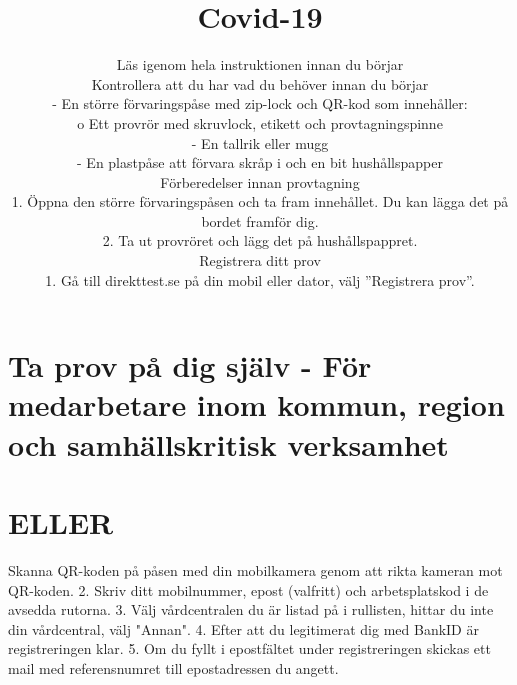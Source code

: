 \title{
Covid-19
}
\section*{Ta prov på dig själv - För medarbetare inom kommun, region och samhällskritisk verksamhet}
\author{
Läs igenom hela instruktionen innan du börjar \\ Kontrollera att du har vad du behöver innan du börjar \\ - En större förvaringspåse med zip-lock och QR-kod som innehåller: \\ o Ett provrör med skruvlock, etikett och provtagningspinne \\ - En tallrik eller mugg \\ - En plastpåse att förvara skråp i och en bit hushållspapper \\ Förberedelser innan provtagning \\ 1. Öppna den större förvaringspåsen och ta fram innehållet. Du kan lägga det på bordet framför dig. \\ 2. Ta ut provröret och lägg det på hushållspappret.
 \\ Registrera ditt prov \\ 1. Gå till direkttest.se på din mobil eller dator, välj ”Registrera prov”.
}
\section*{ELLER}
Skanna QR-koden på påsen med din mobilkamera genom att rikta kameran mot QR-koden.
2. Skriv ditt mobilnummer, epost (valfritt) och arbetsplatskod i de avsedda rutorna.
3. Välj vårdcentralen du är listad på i rullisten, hittar du inte din vårdcentral, välj "Annan".
4. Efter att du legitimerat dig med BankID är registreringen klar.
5. Om du fyllt i epostfältet under registreringen skickas ett mail med referensnumret till epostadressen du angett.

